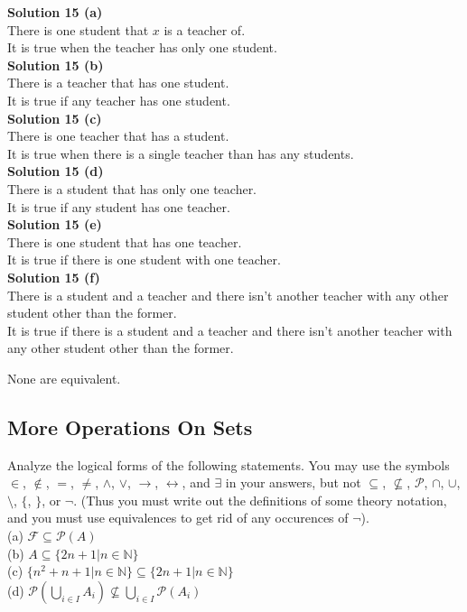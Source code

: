 \textbf{Solution 15 (a)} \\
There is one student that $x$ is a teacher of. \\
It is true when the teacher has only one student. \\
\textbf{Solution 15 (b)} \\
There is a teacher that has one student. \\
It is true if any teacher has one student. \\
\textbf{Solution 15 (c)} \\
There is one teacher that has a student. \\
It is true when there is a single teacher than has any students. \\
\textbf{Solution 15 (d)} \\
There is a student that has only one teacher. \\
It is true if any student has one teacher. \\
\textbf{Solution 15 (e)} \\
There is one student that has one teacher. \\
It is true if there is one student with one teacher. \\
\textbf{Solution 15 (f)} \\
There is a student and a teacher and there isn't another teacher with any other student
other than the former. \\
It is true if there is a student and a teacher and there isn't another teacher with any other student
other than the former. 

None are equivalent.

\subsection{More Operations On Sets}

\begin{tcolorbox}[title=Problem 1, breakable]
    Analyze the logical forms of the following statements. You may use the symbols
    $\in$, $\not \in$, $=$, $\not =$, $\wedge$, $\vee$, $\rightarrow$,
    $\leftrightarrow$, and $\exists$ in your answers, but not
    $\subseteq$, $\not \subseteq$,  $\mathcal{P}$, $\cap$, $\cup$,
    $\setminus$, $\{$, $\}$, or $\neg$. (Thus you must write out the definitions of some
    theory notation, and you must use equivalences to get rid of any occurences
    of $\neg$). \\
    (a) $\mathcal{F} \subseteq \mathcal{P}{(A)}$ \\
    (b) $A \subseteq \{2n + 1 | n \in \mathbb{N}\}$ \\
    (c) $\{n^2 + n + 1 | n \in \mathbb{N}\} \subseteq \{2n + 1 | n \in \mathbb{N}\}$ \\
    (d) $\mathcal{P}(\bigcup_{i \in I} A_i) \not \subseteq \bigcup_{i \in I} \mathcal{P}(A_i)$
\end{tcolorbox}


